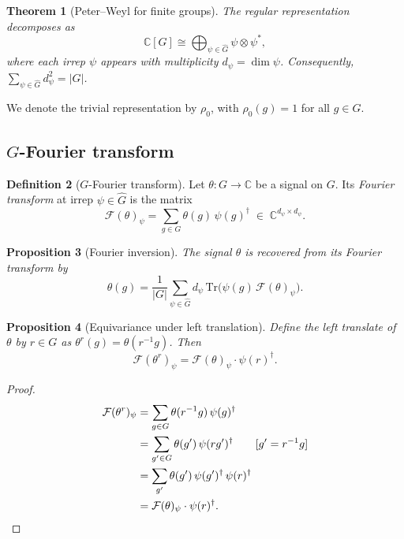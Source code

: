 \documentclass{article}
\newtheorem{theorem}{Theorem}[section]
\newtheorem{proposition}[theorem]{Proposition}
\theoremstyle{definition}
\newtheorem{definition}[theorem]{Definition}
\theoremstyle{remark}
\newcommand{\FF}{\mathcal{F}}
\newcommand{\C}{\mathbb{C}}
\newcommand{\Ghat}{\widehat{G}}
\begin{document}
\begin{theorem}[Peter--Weyl for finite groups]
The regular representation decomposes as
\[
\C[G] \cong \bigoplus_{\psi \in \Ghat} \psi \otimes \psi^*,
\]
where each irrep $\psi$ appears with multiplicity $d_\psi = \dim \psi$. Consequently, $\sum_{\psi \in \Ghat} d_\psi^2 = |G|$.
\end{theorem}

We denote the trivial representation by $\rho_0$, with $\rho_0(g) = 1$ for all $g \in G$.

\subsection{$G$-Fourier transform}\label{sec:gft}

\begin{definition}[$G$-Fourier transform]
Let $\theta : G \to \C$ be a signal on $G$. Its \textit{Fourier transform} at irrep $\psi \in \Ghat$ is the matrix
\begin{equation}\label{eq:gft}
\FF(\theta)_\psi = \sum_{g \in G} \theta(g)\, \psi(g)^\dagger \;\in\; \C^{d_\psi \times d_\psi}.
\end{equation}
\end{definition}

\begin{proposition}[Fourier inversion]\label{prop:inversion}
The signal $\theta$ is recovered from its Fourier transform by
\[
\theta(g) = \frac{1}{|G|} \sum_{\psi \in \Ghat} d_\psi \,\mathrm{Tr}\bigl(\psi(g)\, \FF(\theta)_\psi\bigr).
\]
\end{proposition}

\begin{proposition}[Equivariance under left translation]\label{prop:ft_equiv_prelim}
Define the left translate of $\theta$ by $r \in G$ as $\theta^r(g) = \theta(r^{-1}g)$. Then
\begin{equation}\label{eq:ft_equiv}
\FF(\theta^r)_\psi = \FF(\theta)_\psi \cdot \psi(r)^\dagger.
\end{equation}
\end{proposition}
\begin{proof}
\begin{align*}
\FF(\theta^r)_\psi
&= \sum_{g \in G} \theta(r^{-1}g)\, \psi(g)^\dagger \\
&= \sum_{g' \in G} \theta(g')\, \psi(rg')^\dagger \qquad [g' = r^{-1}g] \\
&= \sum_{g'} \theta(g')\, \psi(g')^\dagger\, \psi(r)^\dagger \\
&= \FF(\theta)_\psi \cdot \psi(r)^\dagger. \qedhere
\end{align*}
\end{proof}
\end{document}
